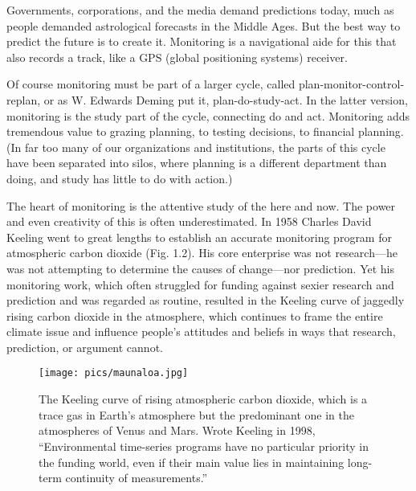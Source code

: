 \documentclass[11pt,letterpaper,oneside,onecolumn]{memoir}
\begin{document}
Governments, corporations, and the media demand predictions today, much as people demanded astrological forecasts in the Middle Ages. But the best way to predict the future is to create it. Monitoring is a navigational aide for this that also records a track, like a GPS (global positioning systems) receiver.

Of course monitoring must be part of a larger cycle, called plan-monitor-control-replan, or as W. Edwards Deming put it, plan-do-study-act. In the latter version, monitoring is the study part of the cycle, connecting do and act. Monitoring adds tremendous value to grazing planning, to testing decisions, to financial planning. (In far too many of our organizations and institutions, the parts of this cycle have been separated into silos, where planning is a different department than doing, and study has little to do with action.)

The heart of monitoring is the attentive study of the here and now. The power and even creativity of this is often underestimated. In 1958 Charles David Keeling went to great lengths to establish an accurate monitoring program for atmospheric carbon dioxide (Fig. 1.2). His core enterprise was not research---he was not attempting to determine the causes of change---nor prediction. Yet his monitoring work, which often struggled for funding against sexier research and prediction and was regarded as routine, resulted in the Keeling curve of jaggedly rising carbon dioxide in the atmosphere, which continues to frame the entire climate issue and influence people's attitudes and beliefs in ways that research, prediction, or argument cannot.

\begin{figure}
\centering
\texttt{[image: pics/maunaloa.jpg]}
\caption{The Keeling curve of rising atmospheric carbon dioxide, which is a trace gas in Earth's atmosphere but the predominant one in the atmospheres of Venus and Mars. Wrote Keeling in 1998, ``Environmental time-series programs have no particular priority in the funding world, even if their main value lies in maintaining long-term continuity of measurements.''}
\end{figure}
\end{document}
